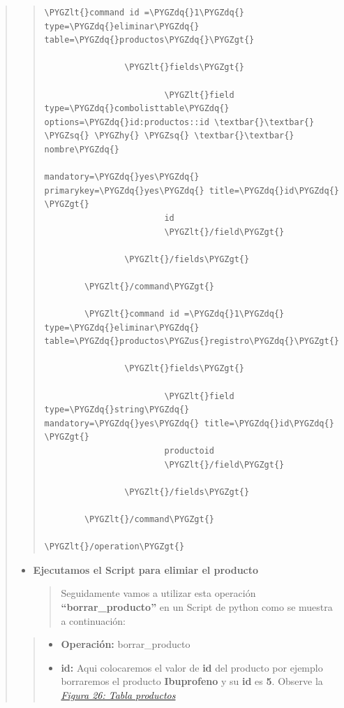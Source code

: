 \documentclass[letterpaper,11pt,spanish]{sphinxmanual}
\def\PYGZus{\char`\_}
\def\PYGZlt{\char`\<}
\def\PYGZgt{\char`\>}
\def\PYGZhy{\char`\-}
\def\PYGZsq{\char`\'}
\def\PYGZdq{\char`\"}
\begin{document}
\begin{quote}
\begin{quote}
\begin{Verbatim}[commandchars=\\\{\}]
        \PYGZlt{}command id =\PYGZdq{}1\PYGZdq{} type=\PYGZdq{}eliminar\PYGZdq{} table=\PYGZdq{}productos\PYGZdq{}\PYGZgt{}

                \PYGZlt{}fields\PYGZgt{}

                        \PYGZlt{}field type=\PYGZdq{}combolisttable\PYGZdq{} options=\PYGZdq{}id:productos::id \textbar{}\textbar{} \PYGZsq{} \PYGZhy{} \PYGZsq{} \textbar{}\textbar{} nombre\PYGZdq{}
                                                                mandatory=\PYGZdq{}yes\PYGZdq{} primarykey=\PYGZdq{}yes\PYGZdq{} title=\PYGZdq{}id\PYGZdq{} \PYGZgt{}
                        id
                        \PYGZlt{}/field\PYGZgt{}

                \PYGZlt{}/fields\PYGZgt{}

        \PYGZlt{}/command\PYGZgt{}

        \PYGZlt{}command id =\PYGZdq{}1\PYGZdq{} type=\PYGZdq{}eliminar\PYGZdq{} table=\PYGZdq{}productos\PYGZus{}registro\PYGZdq{}\PYGZgt{}

                \PYGZlt{}fields\PYGZgt{}

                        \PYGZlt{}field type=\PYGZdq{}string\PYGZdq{}  mandatory=\PYGZdq{}yes\PYGZdq{} title=\PYGZdq{}id\PYGZdq{} \PYGZgt{}
                        productoid
                        \PYGZlt{}/field\PYGZgt{}

                \PYGZlt{}/fields\PYGZgt{}

        \PYGZlt{}/command\PYGZgt{}

\PYGZlt{}/operation\PYGZgt{}
\end{Verbatim}
\end{quote}
\begin{itemize}
\item {} 
\textbf{Ejecutamos el Script para elimiar el producto}
\begin{quote}

Seguidamente vamos a utilizar esta operación \textbf{``borrar\_producto''} en un Script de python como se muestra a continuación:
\end{quote}

\end{itemize}
\begin{quote}
\begin{itemize}
\item {} 
\textbf{Operación:} borrar\_producto

\item {} 
\textbf{id:} Aqui colocaremos el valor de \textbf{id} del producto por ejemplo borraremos el producto \textbf{Ibuprofeno} y su \textbf{id} es \textbf{5}. Observe la {\hyperref[_templates/Contenido6/Parte2:figura1]{\emph{Figura 26: Tabla productos}}}


\end{itemize}
\end{quote}
\end{quote}
\end{document}
